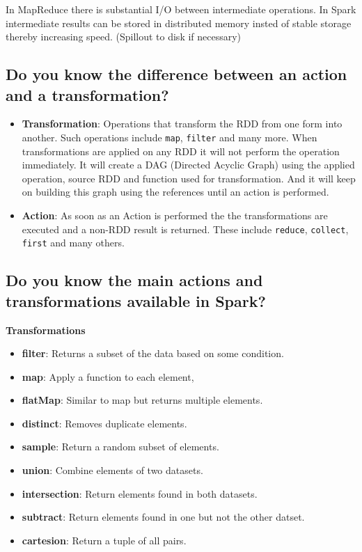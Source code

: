 \documentclass{article}
\begin{document}
In MapReduce there is substantial I/O between intermediate operations. In Spark intermediate results can be stored in distributed memory insted of stable storage thereby increasing speed. (Spillout to disk if necessary)

\subsection{Do you know the difference between an action and a transformation?}

\begin{itemize}
    \item \textbf{Transformation}: Operations that transform the RDD from one form into another. Such operations include \texttt{map}, \texttt{filter} and many more. When transformations are applied on any RDD it will not perform the operation immediately. It will create a DAG (Directed Acyclic Graph) using the applied operation, source RDD and function used for transformation. And it will keep on building this graph using the references until an action is performed. 
    \item \textbf{Action}: As soon as an Action is performed the the transformations are executed and a non-RDD result is returned. These include \texttt{reduce}, \texttt{collect}, \texttt{first} and many others. 
\end{itemize}


\subsection{Do you know the main actions and transformations available in Spark?}

\textbf{Transformations}

\begin{itemize}
    \item \textbf{filter}: Returns a subset of the data based on some condition.
    \item \textbf{map}: Apply a function to each element,
    \item \textbf{flatMap}: Similar to map but returns multiple elements. 
    \item \textbf{distinct}: Removes duplicate elements. 
    \item \textbf{sample}: Return a random subset of elements. 
    \item \textbf{union}: Combine elements of two datasets.
    \item \textbf{intersection}: Return elements found in both datasets. 
    \item \textbf{subtract}: Return elements found in one but not the other datset. 
    \item \textbf{cartesion}: Return a tuple of all pairs. 
\end{itemize}
\end{document}
